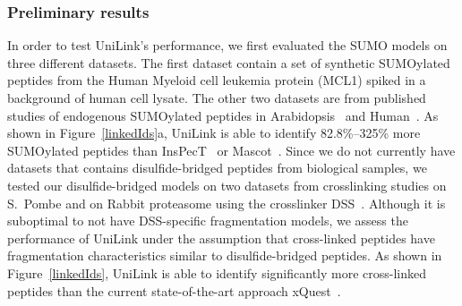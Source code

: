 \documentclass[arial,11pt]{article}
\begin{document}
\subsubsection{Preliminary results}
In order to test UniLink's performance, we first evaluated the SUMO models on three different datasets. The first  dataset contain a set of synthetic SUMOylated peptides from the Human Myeloid cell leukemia protein (MCL1) spiked in a background of human cell lysate. The other two datasets are from published studies of endogenous SUMOylated peptides in Arabidopsis~\cite{miller2010humansumo} and Human~\cite{matic2010site}. As shown in Figure~\ref{linkedIds}a, UniLink is able to identify 82.8\%--325\% more SUMOylated peptides than InsPecT~\cite{tanner05} or Mascot~\cite{mascot99}.  Since we do not currently have datasets that contains disulfide-bridged peptides from biological samples, we tested our disulfide-bridged models on two datasets from crosslinking studies on S.~Pombe and on Rabbit proteasome using the crosslinker DSS~\cite{leitner2012expanding}.  Although it is suboptimal to not have DSS-specific fragmentation models, we assess the performance of UniLink under the assumption that cross-linked peptides have fragmentation characteristics similar to disulfide-bridged peptides.  As shown in Figure~\ref{linkedIds}, UniLink is able to identify significantly more cross-linked peptides than the current state-of-the-art approach xQuest~\cite{rinner2008}.
\end{document}
